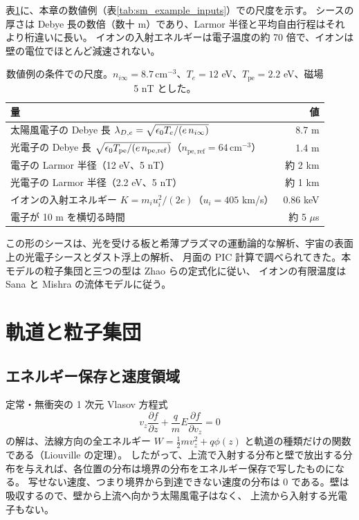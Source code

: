 表\ref{tab:sm_scales}に、本章の数値例（表\ref{tab:sm_example_inputs}）での尺度を示す。
シースの厚さは Debye 長の数倍（数十 m）であり、Larmor 半径と平均自由行程はそれより桁違いに長い。
イオンの入射エネルギーは電子温度の約 70 倍で、イオンは壁の電位でほとんど減速されない。

\begin{table}[htbp]
\centering
\caption{数値例の条件での尺度。$n_{i\infty}=8.7\,\mathrm{cm^{-3}}$、$T_e=12$ eV、$T_{\mathrm{pe}}=2.2$ eV、磁場 5 nT とした。}
\label{tab:sm_scales}
\begin{tabular}{lr}
\toprule
量 & 値 \\
\midrule
太陽風電子の Debye 長 $\lambda_{D,e}=\sqrt{\epsilon_0 T_e/(e\,n_{i\infty})}$ & 8.7 m \\
光電子の Debye 長 $\sqrt{\epsilon_0 T_{\mathrm{pe}}/(e\,n_{\mathrm{pe,ref}})}$（$n_{\mathrm{pe,ref}}=64\,\mathrm{cm^{-3}}$） & 1.4 m \\
電子の Larmor 半径（12 eV、5 nT） & 約 2 km \\
光電子の Larmor 半径（2.2 eV、5 nT） & 約 1 km \\
イオンの入射エネルギー $K=m_iu_i^2/(2e)$（$u_i=405$ km/s） & 0.86 keV \\
電子が 10 m を横切る時間 & 約 5 $\mu$s \\
\bottomrule
\end{tabular}
\end{table}

この形のシースは、光を受ける板と希薄プラズマの運動論的な解析\citep{GuernseyFu1970}、宇宙の表面上の光電子シースとダスト浮上の解析\citep{Nitter1998}、
月面の PIC 計算\citep{PoppeHoranyi2010}で調べられてきた。本モデルの粒子集団と三つの型は Zhao らの定式化に従い\citep{Zhao2020}、
イオンの有限温度は Sana と Mishra の流体モデルに従う\citep{SanaMishra2026}。

\section{軌道と粒子集団}
\label{sec:sm_orbits}

\subsection{エネルギー保存と速度領域}
定常・無衝突の 1 次元 Vlasov 方程式
\begin{equation}
 v_z\frac{\partial f}{\partial z}+\frac{q}{m}E\frac{\partial f}{\partial v_z}=0
\end{equation}
の解は、法線方向の全エネルギー $W=\tfrac12 mv_z^2+q\phi(z)$ と軌道の種類だけの関数である（Liouville の定理）。
したがって、上流で入射する分布と壁で放出する分布を与えれば、各位置の分布は境界の分布をエネルギー保存で写したものになる。
写せない速度、つまり境界から到達できない速度の分布は 0 である。壁は吸収するので、壁から上流へ向かう太陽風電子はなく、
上流から入射する光電子もない。

